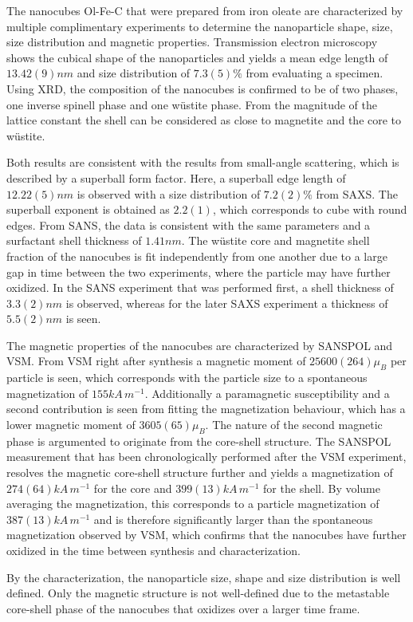 \documentclass[\main/dresen_thesis.tex]{subfiles}
\begin{document}
  \label{sec:colloidalCrystals:nanoparticle:summary}
  The nanocubes Ol-Fe-C that were prepared from iron oleate are characterized by multiple complimentary experiments to determine the nanoparticle shape, size, size distribution and magnetic properties.
  Transmission electron microscopy shows the cubical shape of the nanoparticles and yields a mean edge length of $13.42(9) \unit{nm}$ and size distribution of $7.3(5) \%$ from evaluating a specimen.
  Using XRD, the composition of the nanocubes is confirmed to be of two phases, one inverse spinell phase and one w\"ustite phase.
  From the magnitude of the lattice constant the shell can be considered as close to magnetite and the core to w\"ustite.

  Both results are consistent with the results from small-angle scattering, which is described by a superball form factor.
  Here, a superball edge length of $12.22(5) \unit{nm}$ is observed with a size distribution of $7.2(2) \%$ from SAXS.
  The superball exponent is obtained as $2.2(1)$, which corresponds to cube with round edges.
  From SANS, the data is consistent with the same parameters and a surfactant shell thickness of $1.41 \unit{nm}$.
  The w\"ustite core and magnetite shell fraction of the nanocubes is fit independently from one another due to a large gap in time between the two experiments, where the particle may have further oxidized.
  In the SANS experiment that was performed first, a shell thickness of $3.3(2) \unit{nm}$ is observed, whereas for the later SAXS experiment a thickness of $5.5(2) \unit{nm}$ is seen.
  
  The magnetic properties of the nanocubes are characterized by SANSPOL and VSM.
  From VSM right after synthesis a magnetic moment of $25600(264) \mu_B$ per particle is seen, which corresponds with the particle size to a spontaneous magnetization of $155 \unit{kA \, m^{-1}}$.
  Additionally a paramagnetic susceptibility and a second contribution is seen from fitting the magnetization behaviour, which has a lower magnetic moment of $3605(65) \mu_B$.
  The nature of the second magnetic phase is argumented to originate from the core-shell structure.
  The SANSPOL measurement that has been chronologically performed after the VSM experiment, resolves the magnetic core-shell structure further and yields a magnetization of $274(64) \unit{kA \, m^{-1}}$ for the core and $399(13) \unit{kA \, m^{-1}}$ for the shell.
  By volume averaging the magnetization, this corresponds to a particle magnetization of $387(13) \unit{kA \, m^{-1}}$ and is therefore significantly larger than the spontaneous magnetization observed by VSM, which confirms that the nanocubes have further oxidized in the time between synthesis and characterization.

  By the characterization, the nanoparticle size, shape and size distribution is well defined.
  Only the magnetic structure is not well-defined due to the metastable core-shell phase of the nanocubes that oxidizes over a larger time frame.
\end{document}
